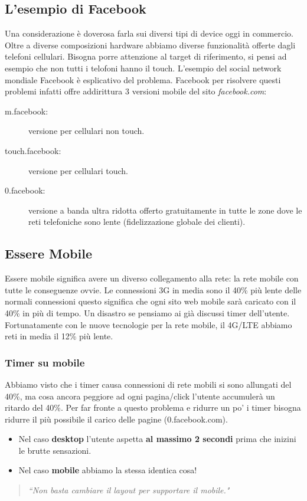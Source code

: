 		\subsection{L'esempio di Facebook}
			Una considerazione è doverosa farla sui diversi tipi di device oggi in commercio. Oltre a diverse composizioni hardware abbiamo diverse funzionalità offerte dagli telefoni cellulari. Bisogna porre attenzione al target di riferimento, si pensi ad esempio che non tutti i telofoni hanno il touch.
			L'esempio del social network mondiale Facebook è esplicativo del problema. Facebook per risolvere questi problemi infatti offre addirittura 3 versioni mobile del sito \emph{facebook.com}:
			\begin{description}
				\item [m.facebook:] versione per cellulari non touch.
				\item [touch.facebook:] versione per cellulari touch.
				\item [0.facebook:] versione a banda ultra ridotta offerto gratuitamente in tutte le zone dove le reti telefoniche sono lente (fidelizzazione globale dei clienti).		
			\end{description}
		
		\subsection{Essere Mobile}
			Essere mobile significa avere un diverso collegamento alla rete: la rete mobile con tutte le conseguenze ovvie.
			Le connessioni 3G in media sono il 40\% più lente delle normali connessioni questo significa che ogni sito web mobile sarà caricato con il 40\% in più di tempo. Un disastro se pensiamo ai già discussi timer dell'utente. Fortunatamente con le nuove tecnologie per la rete mobile, il 4G/LTE abbiamo reti in media il 12\% più lente.
			
			\subsubsection{Timer su mobile}
				Abbiamo visto che i timer causa connessioni di rete mobili si sono allungati del 40\%, ma cosa ancora peggiore ad ogni pagina/click l'utente accumulerà un ritardo del 40\%. Per far fronte a questo problema e ridurre un po' i timer bisogna ridurre il più possibile il carico delle pagine (0.facebook.com). 
				\begin{itemize}
					\item Nel caso \textbf{desktop} l'utente aspetta \textbf{al massimo 2 secondi} prima che inizini le brutte sensazioni.
					\item Nel caso \textbf{mobile} abbiamo la stessa identica cosa!
				\end{itemize}
				\begin{quote}
					\emph{``Non basta cambiare il layout per supportare il mobile."}  
				\end{quote}
